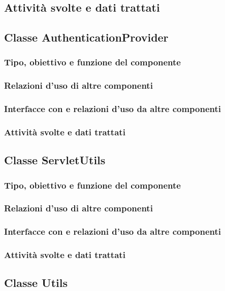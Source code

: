 \subsection*{Attivit\`a svolte e dati trattati}

\subsection{Classe AuthenticationProvider}
\subsubsection*{Tipo, obiettivo e funzione del componente}
\subsubsection*{Relazioni d'uso di altre componenti}
\subsubsection*{Interfacce con e relazioni d'uso da altre componenti}
\subsubsection*{Attivit\`a svolte e dati trattati}

\subsection{Classe ServletUtils}
\subsubsection*{Tipo, obiettivo e funzione del componente}
\subsubsection*{Relazioni d'uso di altre componenti}
\subsubsection*{Interfacce con e relazioni d'uso da altre componenti}
\subsubsection*{Attivit\`a svolte e dati trattati}

\subsection{Classe Utils}
